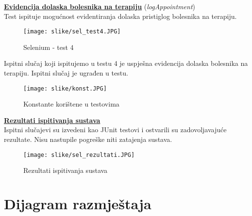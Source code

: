 			\pagebreak
			\underline{\textbf{Evidencija dolaska bolesnika na terapiju}} (\textit{logAppointment})\\
			Test ispituje mogućnost evidentiranja dolaska pristiglog bolesnika na terapiju.			
			\begin{figure}[H]
				\texttt{[image: slike/sel\_test4.JPG]} %
				\centering
				\caption{Selenium - test 4}
				\label{fig:promjene}
			\end{figure}
			Ispitni slučaj koji ispitujemo u testu 4 je uspješna evidencija dolaska bolesnika na terapiju. Ispitni slučaj je ugrađen u testu.
			
			\begin{figure}[H]
				\texttt{[image: slike/konst.JPG]} %
				\centering
				\caption{Konstante korištene u testovima}
				\label{fig:promjene}
			\end{figure}
			\underline{\textbf{Rezultati ispitivanja sustava}}\\ 
			Ispitni slučajevi su izvedeni kao JUnit testovi i ostvarili su zadovoljavajuće rezultate. Nisu nastupile pogreške niti zatajenja sustava.
			\begin{figure}[H]
				\texttt{[image: slike/sel\_rezultati.JPG]} %
				\centering
				\caption{Rezultati ispitivanja sustava}
				\label{fig:promjene}
			\end{figure}
			\eject 
		
		
		\section{Dijagram razmještaja}
			
			
			
